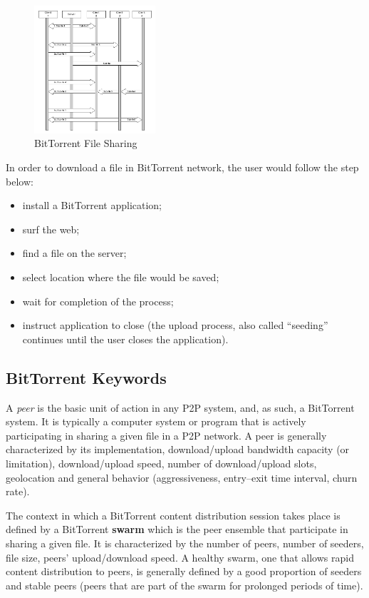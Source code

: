 \begin{figure}
  \centering
  \includegraphics[width=0.4\textwidth]{src/img/p2p-systems/bittorrent-sharing}
  \caption{BitTorrent File Sharing}
  \label{fig:p2p-systems:bittorrent-sharing}
\end{figure}

In order to download a file in BitTorrent network, the user would follow the
step below:

\begin{itemize}
  \item install a BitTorrent application;
  \item surf the web;
  \item find a file on the server;
  \item select location where the file would be saved;
  \item wait for completion of the process;
  \item instruct application to close (the upload process, also called
  ``seeding'' continues until the user closes the application).
\end{itemize}

\subsection{BitTorrent Keywords}

A \textit{peer} is the basic unit of action in any P2P system, and, as such, a
BitTorrent system. It is typically a computer system or program that is
actively participating in sharing a given file in a P2P network. A peer is
generally characterized by its implementation, download/upload bandwidth
capacity (or limitation), download/upload speed, number of download/upload
slots, geolocation and general behavior (aggressiveness, entry--exit time
interval, churn rate).

The context in which a BitTorrent content distribution session takes place is
defined by a BitTorrent \textbf{swarm} which is the peer ensemble that
participate in sharing a given file. It is characterized by the number of
peers, number of seeders, file size, peers' upload/download speed. A healthy
swarm, one that allows rapid content distribution to peers, is generally
defined by a good proportion of seeders and stable peers (peers that are part
of the swarm for prolonged periods of time).

